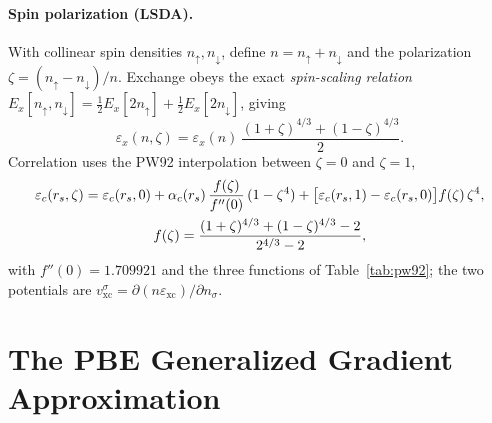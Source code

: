 \paragraph{Spin polarization (LSDA).} With collinear spin densities
$n_\uparrow, n_\downarrow$, define $n = n_\uparrow + n_\downarrow$ and the
polarization $\zeta = (n_\uparrow - n_\downarrow)/n$. Exchange obeys the
exact \emph{spin-scaling relation}
$E_x[n_\uparrow,n_\downarrow] = \tfrac12 E_x[2n_\uparrow]
+ \tfrac12 E_x[2n_\downarrow]$, giving
\begin{equation}
\varepsilon_x(n,\zeta) = \varepsilon_x(n)\,
\frac{(1+\zeta)^{4/3} + (1-\zeta)^{4/3}}{2}.
\end{equation}
Correlation uses the PW92 interpolation between $\zeta=0$ and $\zeta=1$,
\begin{gather}
\varepsilon_c(r_s,\zeta) = \varepsilon_c(r_s,0)
+ \alpha_c(r_s)\,\frac{f(\zeta)}{f''(0)}\,(1-\zeta^4)
+ \big[\varepsilon_c(r_s,1) - \varepsilon_c(r_s,0)\big] f(\zeta)\,\zeta^4,
\\
f(\zeta) = \frac{(1+\zeta)^{4/3} + (1-\zeta)^{4/3} - 2}{2^{4/3} - 2},
\notag
\end{gather}
with $f''(0) = 1.709921$ and the three functions of
Table~\ref{tab:pw92}; the two potentials are
$v_{\mathrm{xc}}^{\sigma} = \partial (n\varepsilon_{\mathrm{xc}})/\partial
n_\sigma$.

\section{The PBE Generalized Gradient Approximation}
\label{sec:pbe}

